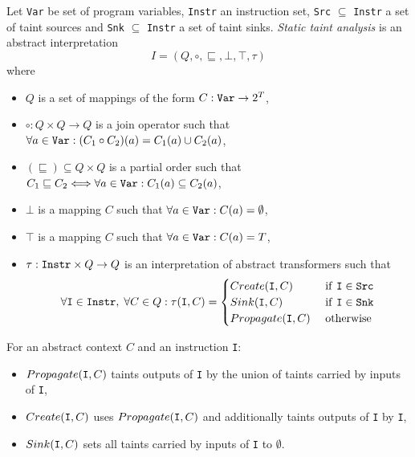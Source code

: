 \begin{defn}
\label{def_taint}
Let \texttt{Var} be set of program variables, \texttt{Instr} an instruction set, \texttt{Src} $\subseteq$ \texttt{Instr} a set of taint sources and \texttt{Snk} $\subseteq$ \texttt{Instr} a set of taint sinks. \emph{Static taint analysis} is an abstract interpretation $$I = (Q, \circ, \sqsubseteq, \bot, \top, \tau)$$ where
    \begin{itemize}
        \item $Q$ is a set of mappings of the form $C: \text{\texttt{Var}} \rightarrow 2^T$,
        \item $\circ: Q \times Q \rightarrow Q$ is a join operator such that $\forall a \in \text{\texttt{Var}}: (C_1 \circ C_2)(a) = C_1(a) \cup C_2(a)$,
        \item $(\sqsubseteq) \subseteq Q \times Q$ is a partial order such that $C_1 \sqsubseteq C_2 \Longleftrightarrow \forall a \in \text{\texttt{Var}}: C_1(a) \subseteq C_2(a)$,  
        \item $\bot$ is a mapping $C$ such that $\forall a \in \text{\texttt{Var}}: C(a) = \emptyset$,
        \item $\top$ is a mapping $C$ such that $\forall a \in \text{\texttt{Var}}: C(a) = T$,
        \item $\tau: \text{\texttt{Instr}}\times Q \rightarrow Q$ is an interpretation of abstract transformers such that
        \begin{equation*}
            \forall \text{\texttt{I}} \in \text{\texttt{Instr}}, \; \forall C \in Q: \tau(\text{\texttt{I}},C) = 
            \begin{cases}
                Create(\text{\texttt{I}}, C) & \text{ if \texttt{I}} \in \text{\texttt{Src}}\\
                Sink(\text{\texttt{I}}, C) & \text{ if \texttt{I}} \in \text{\texttt{Snk}}\\
                Propagate(\text{\texttt{I}}, C) & \text{ otherwise}
            \end{cases}
        \end{equation*}
    \end{itemize}
For an abstract context $C$ and an instruction \texttt{I}:
\begin{itemize}
    \item $Propagate(\text{\texttt{I}}, C)$ taints outputs of \texttt{I} by the union of taints carried by inputs of \texttt{I},
    \item $Create(\text{\texttt{I}}, C)$ uses $Propagate(\text{\texttt{I}}, C)$ and additionally taints outputs of \texttt{I} by \texttt{I},
    \item $Sink(\text{\texttt{I}}, C)$ sets all taints carried by inputs of \texttt{I} to $\emptyset$.
\end{itemize}
\end{defn}

